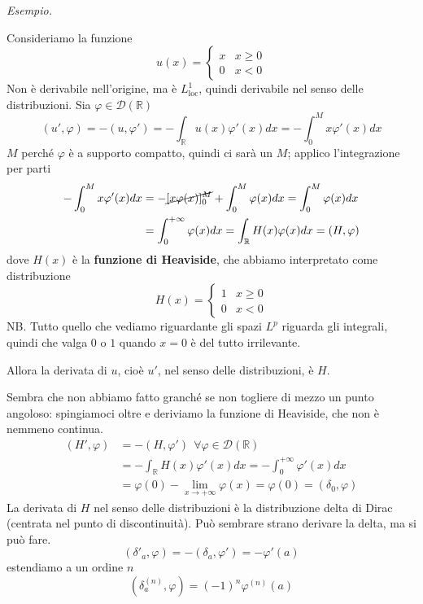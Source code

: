 \documentclass[10pt,a4paper,twoside]{book}
\begin{document}
\textit{Esempio.}

Consideriamo la funzione
\begin{equation*}
u( x) =\begin{cases}
x & x\geqslant 0\\
0 & x< 0
\end{cases}
\end{equation*}
Non è derivabile nell'origine, ma è $L^{1}_{\mathrm{loc}}$, quindi derivabile nel senso delle distribuzioni. Sia $\varphi \in \mathcal{D}(\mathbb{R})$
\begin{equation*}
( u',\varphi ) =-( u,\varphi ') =-\int _{\mathbb{R}} u( x) \varphi '( x) dx=-\int ^{M}_{0} x\varphi '( x) dx
\end{equation*}
$M$ perché $\varphi $ è a supporto compatto, quindi ci sarà un $M$; applico l'integrazione per parti
\begin{align*}
-\int ^{M}_{0} x\varphi '( x) dx & =-\cancel{[ x\varphi ( x)]^{M}_{0}} +\int ^{M}_{0} \varphi ( x) dx=\int ^{M}_{0} \varphi ( x) dx\\
 & =\int ^{+\infty }_{0} \varphi ( x) dx=\int _{\mathbb{R}} H( x) \varphi ( x) dx=( H,\varphi )
\end{align*}
dove $H( x)$ è la \textbf{funzione di Heaviside}, che abbiamo interpretato come distribuzione
\begin{equation*}
H( x) =\begin{cases}
1 & x\geqslant 0\\
0 & x< 0
\end{cases}
\end{equation*}
NB. Tutto quello che vediamo riguardante gli spazi $L^{p}$ riguarda gli integrali, quindi che valga $0$ o $1$ quando $x=0$ è del tutto irrilevante.

Allora la derivata di $u$, cioè $u'$, nel senso delle distribuzioni, è $H$.

Sembra che non abbiamo fatto granché se non togliere di mezzo un punto angoloso: spingiamoci oltre e deriviamo la funzione di Heaviside, che non è nemmeno continua.
\begin{align*}
( H',\varphi ) & =-( H,\varphi ') \ \ \forall \varphi \in \mathcal{D}(\mathbb{R})\\
 & =-\int _{\mathbb{R}} H( x) \varphi '( x) dx=-\int ^{+\infty }_{0} \varphi '( x) dx\\
 & =\varphi ( 0) -\lim _{x\rightarrow +\infty } \varphi ( x) =\varphi ( 0) =( \delta _{0} ,\varphi )
\end{align*}
La derivata di $H$ nel senso delle distribuzioni è la distribuzione delta di Dirac (centrata nel punto di discontinuità). Può sembrare strano derivare la delta, ma si può fare.
\begin{equation*}
( \delta '_{a} ,\varphi ) =-( \delta _{a} ,\varphi ') =-\varphi '( a)
\end{equation*}
estendiamo a un ordine $n$
\begin{equation*}
\left( \delta ^{( n)}_{a} ,\varphi \right) =( -1)^{n} \varphi ^{( n)}( a)
\end{equation*}
\end{document}
